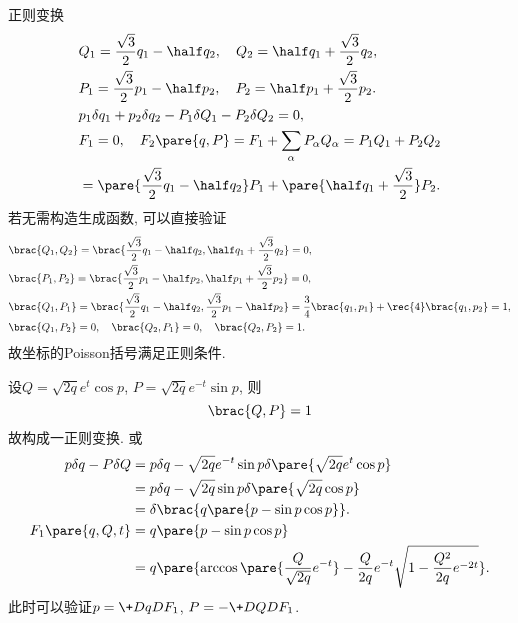 \documentclass{ctexart}
\begin{document}
\begin{sample}
    \begin{ex}[习题3.17]
        正则变换
        \begin{align*}
            & Q_1 = \frac{\sqrt{3}}{2}q_1 - \half q_2,\quad Q_2 = \half q_1 + \frac{\sqrt{3}}{2}{q_2}, \\
            & P_1 = \frac{\sqrt{3}}{2}p_1 - \half p_2,\quad P_2 = \half p_1 + \frac{\sqrt{3}}{2}p_2. \\
            & p_1\delta q_1 + p_2 \delta q_2 - P_1 \delta Q_1 - P_2 \delta Q_2 = 0, \\
            & F_1 = 0, \quad F_2\pare{q,P} = F_1 + \sum_\alpha P_\alpha Q_\alpha = P_1Q_1 + P_2Q_2 \\ &= \pare{\frac{\sqrt{3}}{2}q_1 - \half q_2}P_1 + \pare{\half q_1 + \frac{\sqrt{3}}{2}}P_2.
        \end{align*}
        若无需构造生成函数, 可以直接验证
        \begin{align*}
            & \brac{Q_1,Q_2} = \brac{\frac{\sqrt{3}}{2}q_1 - \half q_2, \half q_1 + \frac{\sqrt{3}}{2}q_2} = 0, \\
            & \brac{P_1,P_2} = \brac{\frac{\sqrt{3}}{2}p_1 - \half p_2, \half p_1 + \frac{\sqrt{3}}{2}p_2} = 0, \\
            & \brac{Q_1,P_1} = \brac{\frac{\sqrt{3}}{2}q_1 - \half q_2, \frac{\sqrt{3}}{2}p_1 - \half p_2} = \frac{3}{4}\brac{q_1,p_1} + \rec{4}\brac{q_1,p_2} = 1, \\
            & \brac{Q_1,P_2} = 0,\quad \brac{Q_2,P_1} = 0,\quad \brac{Q_2,P_2} = 1.
        \end{align*}
        故坐标的Poisson括号满足正则条件.
    \end{ex}
\end{sample}
\begin{sample}
    \begin{ex}
        设$Q = \sqrt{2q}e^t \cos p$, $P = \sqrt{2q}e^{-t}\sin p$, 则
        \[ \brac{Q,P} = 1 \]
        故构成一正则变换. 或
        \begin{align*}
            p\delta q - P\delta Q &= p\delta q - \sqrt{2q}e^{-t}\sin p\delta\pare{\sqrt{2q}e^t \cos p} \\
            &= p\delta q - \sqrt{2q}\sin p \delta\pare{\sqrt{2q}\cos p} \\
            &= \delta \brac{q\pare{p - \sin p \cos p}}. \\
            F_1\pare{q,Q,t} &= q\pare{p - \sin p \cos p} \\
            &=q\pare{\arccos\pare{\frac{Q}{\sqrt{2q}} e^{-t}} - \frac{Q}{2q}e^{-t}\sqrt{1-\frac{Q^2}{2q}e^{-2t}}}.
        \end{align*}
        此时可以验证$\displaystyle p = \+DqD{F_1}$, $\displaystyle P = -\+D{Q}D{F_1}$.
    \end{ex}
\end{sample}
\end{document}
